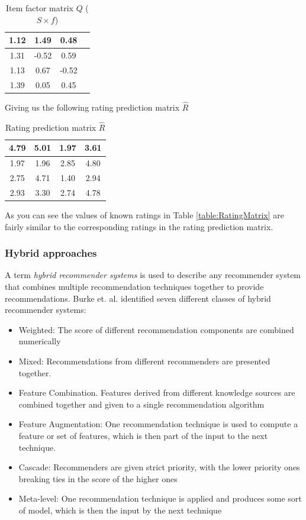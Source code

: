 \begin{table}[!htbp]
\centering
\begin{tabular}{|c|c|c|c|}
\hline
1.12	&	1.49	&	0.48\\ \hline
1.31	&-0.52	&0.59\\ \hline
1.13	&0.67&	-0.52\\ \hline
1.39	&0.05&	0.45\\ \hline
\end{tabular}
\label{table:UserFeature}
\caption{Item factor matrix $Q$ ($S \times f$)}
\end{table}

Giving us the following rating prediction matrix $\hat{R}$

\begin{table}[!htbp]
\centering
\begin{tabular}{|c|c|c|c|}
\hline
4.79	&5.01	&1.97	&3.61 \\ \hline
1.97	&1.96	&2.85	&4.80 \\ \hline
2.75	&4.71	&1.40	&2.94 \\ \hline
2.93	&3.30	&2.74	&4.78 \\ \hline
\end{tabular}
\label{table:PredictionMatrix}
\caption{Rating prediction matrix $\hat{R}$}
\end{table}

As you can see the values of known ratings in Table \ref{table:RatingMatrix} are fairly similar to the corresponding ratings in the rating prediction matrix.

\subsubsection{Hybrid approaches}

A term \emph{hybrid recommender systems} is used to describe any recommender system that combines multiple recommendation techniques together to provide recommendations. Burke et. al. \cite{Burke2002} identified seven different classes of hybrid recommender systems:

\begin{itemize}
\item Weighted: The score of different recommendation components are combined numerically
\item Mixed: Recommendations from different recommenders are presented together.
\item Feature Combination. Features derived from different knowledge sources are combined together and given to a single recommendation algorithm
\item Feature Augmentation: One recommendation technique is used to compute a feature or set of features, which is then part of the input to the next technique.
\item Cascade: Recommenders are given strict priority, with the lower priority ones breaking ties in the score of the higher ones
\item Meta-level: One recommendation technique is applied and produces some sort of model, which is then the input by the next technique
\end{itemize}

